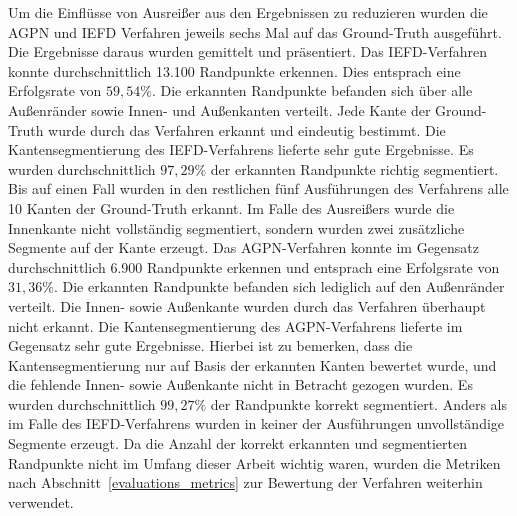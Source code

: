 Um die Einflüsse von Ausreißer aus den Ergebnissen zu reduzieren wurden die AGPN und IEFD Verfahren jeweils sechs Mal auf das Ground-Truth ausgeführt. Die Ergebnisse daraus wurden gemittelt und präsentiert. Das IEFD-Verfahren konnte durchschnittlich 13.100 Randpunkte erkennen. Dies entsprach eine Erfolgsrate von $59,54\%$. Die erkannten Randpunkte befanden sich über alle Außenränder sowie Innen- und Außenkanten verteilt. Jede Kante der Ground-Truth wurde durch das Verfahren erkannt und eindeutig bestimmt. Die Kantensegmentierung des IEFD-Verfahrens lieferte sehr gute Ergebnisse. Es wurden durchschnittlich $97,29\%$ der erkannten Randpunkte richtig segmentiert. Bis auf einen Fall wurden in den restlichen fünf Ausführungen des Verfahrens alle 10 Kanten der Ground-Truth erkannt. Im Falle des Ausreißers wurde die Innenkante nicht vollständig segmentiert, sondern wurden zwei zusätzliche Segmente auf der Kante erzeugt. Das AGPN-Verfahren konnte im Gegensatz durchschnittlich 6.900 Randpunkte erkennen und entsprach eine Erfolgsrate von $31,36\%$. Die erkannten Randpunkte befanden sich lediglich auf den Außenränder verteilt. Die Innen- sowie Außenkante wurden durch das Verfahren überhaupt nicht erkannt. Die Kantensegmentierung des AGPN-Verfahrens lieferte im Gegensatz sehr gute Ergebnisse. Hierbei ist zu bemerken, dass die Kantensegmentierung nur auf Basis der erkannten Kanten bewertet wurde, und die fehlende Innen- sowie Außenkante nicht in Betracht gezogen wurden. Es wurden durchschnittlich $99,27\%$ der Randpunkte korrekt segmentiert. Anders als im Falle des IEFD-Verfahrens wurden in keiner der Ausführungen unvollständige Segmente erzeugt. Da die Anzahl der korrekt erkannten und segmentierten Randpunkte nicht im Umfang dieser Arbeit wichtig waren, wurden die Metriken nach Abschnitt~\ref{evaluations_metrics} zur Bewertung der Verfahren weiterhin verwendet. 


